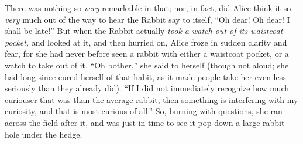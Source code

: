 There was nothing so \emph{very} remarkable in that; nor, in fact, did Alice think it so \emph{very} much out of the way to hear the Rabbit say to itself, “Oh dear!
Oh dear!
I shall be late!” But when the Rabbit actually \emph{took a watch out of its waistcoat pocket,} and looked at it, and then hurried on, Alice froze in sudden clarity and fear, for she had never before seen a rabbit with either a waistcoat pocket, or a watch to take out of it.
“Oh bother,” she said to herself (though not aloud; she had long since cured herself of that habit, as it made people take her even less seriously than they already did).
“If I did not immediately recognize how much curiouser that was than the average rabbit, then something is interfering with my curiosity, and that is most curious of all.” So, burning with questions, she ran across the field after it, and was just in time to see it pop down a large rabbit-hole under the hedge.


